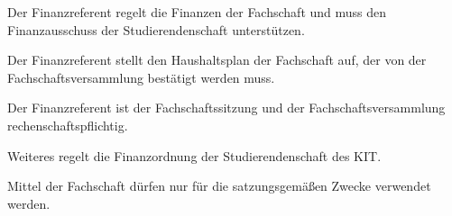 \documentclass[a4paper, parskip=half, numbers=noenddot]{scrartcl}
\begin{document}
\begin{contract}
Der Finanzreferent regelt die Finanzen der Fachschaft und muss den Finanzausschuss der Studierendenschaft unterstützen.

Der Finanzreferent stellt den Haushaltsplan der Fachschaft auf, der von der Fachschaftsversammlung bestätigt werden muss.

Der Finanzreferent ist der Fachschaftssitzung und der Fachschaftsversammlung rechen\-schafts\-pflichtig.

Weiteres regelt die Finanzordnung der Studierendenschaft des KIT.

Mittel der Fachschaft dürfen nur für die satzungsgemäßen Zwecke verwendet werden.


\end{contract}
\end{document}
